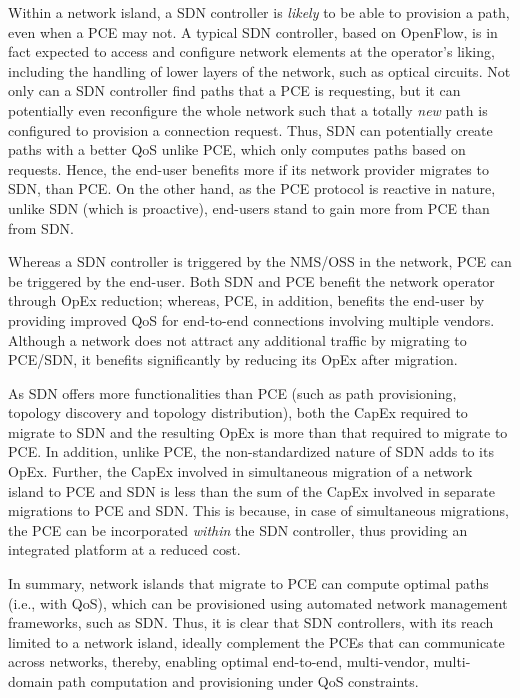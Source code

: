 \documentclass[smallextended]{svjour3}
\begin{document}
\par Within a network island, a SDN controller is \emph{likely} to be able to
provision a path, even when a PCE may not. A typical SDN controller, based on
OpenFlow, is in fact expected to access and configure network elements at the
operator's liking, including the handling of lower layers of the network, such
as optical circuits. Not only can a SDN controller find paths that a PCE is
requesting, but it can potentially even reconfigure the whole network such that
a totally \emph{new} path is configured to provision a connection request. Thus,
SDN can potentially create paths with a better QoS unlike PCE, which only
computes paths based on requests. Hence, the end-user benefits more if its
network provider migrates to SDN, than PCE. On the other hand, as the PCE
protocol is reactive in nature, unlike SDN (which is proactive), end-users stand
to gain more from PCE than from SDN.

\par Whereas a SDN controller is triggered by the NMS/OSS in the network, PCE
can be triggered by the end-user. Both SDN and PCE benefit the network operator
through OpEx reduction; whereas, PCE, in addition, benefits the end-user by
providing improved QoS for end-to-end connections involving multiple vendors.
Although a network does not attract any additional traffic by migrating to
PCE/SDN, it benefits significantly by reducing its OpEx after migration.

\par As SDN offers more functionalities than PCE (such as path provisioning,
topology discovery and topology distribution), both the CapEx required to
migrate to SDN and the resulting OpEx is more than that required to migrate to
PCE. In addition, unlike PCE, the non-standardized nature of SDN adds to its
OpEx.
Further, the CapEx involved in simultaneous migration of a network island to PCE
and SDN is less than the sum of the CapEx involved in separate migrations to PCE
and SDN. This is because, in case of simultaneous migrations, the PCE can be
incorporated \emph{within} the SDN controller, thus providing an integrated
platform at a reduced cost.

\par In summary, network islands that migrate to PCE can compute optimal paths
(i.e., with QoS), which can be provisioned using automated network management
frameworks, such as SDN. Thus, it is clear that SDN controllers, with its reach
limited to a network island, ideally complement the PCEs that can communicate
across networks, thereby, enabling optimal end-to-end, multi-vendor,
multi-domain path computation and provisioning under QoS constraints.
\end{document}
